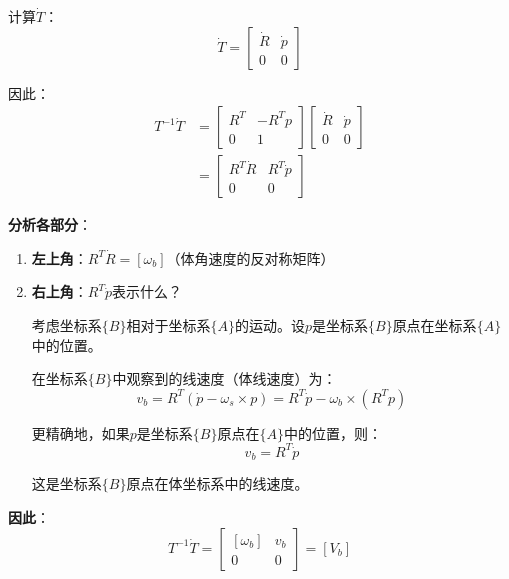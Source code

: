 \documentclass[12pt,a4paper]{article}
\begin{document}
计算$\dot{T}$：
\begin{equation}
\dot{T} = \begin{bmatrix} \dot{R} & \dot{p} \\ 0 & 0 \end{bmatrix}
\end{equation}

因此：
\begin{align}
T^{-1} \dot{T} &= \begin{bmatrix} R^T & -R^T p \\ 0 & 1 \end{bmatrix} \begin{bmatrix} \dot{R} & \dot{p} \\ 0 & 0 \end{bmatrix} \\
&= \begin{bmatrix} R^T \dot{R} & R^T \dot{p} \\ 0 & 0 \end{bmatrix}
\end{align}

\textbf{分析各部分}：

\begin{enumerate}
\item \textbf{左上角}：$R^T \dot{R} = [\omega_b]$（体角速度的反对称矩阵）

\item \textbf{右上角}：$R^T \dot{p}$表示什么？

考虑坐标系$\{B\}$相对于坐标系$\{A\}$的运动。设$p$是坐标系$\{B\}$原点在坐标系$\{A\}$中的位置。

在坐标系$\{B\}$中观察到的线速度（体线速度）为：
\begin{equation}
v_b = R^T (\dot{p} - \omega_s \times p) = R^T \dot{p} - \omega_b \times (R^T p)
\end{equation}

更精确地，如果$p$是坐标系$\{B\}$原点在$\{A\}$中的位置，则：
\begin{equation}
v_b = R^T \dot{p}
\end{equation}

这是坐标系$\{B\}$原点在体坐标系中的线速度。
\end{enumerate}

\textbf{因此}：
\begin{equation}
T^{-1} \dot{T} = \begin{bmatrix} [\omega_b] & v_b \\ 0 & 0 \end{bmatrix} = [V_b]
\label{eq:T_inv_T_dot}
\end{equation}
\end{document}
